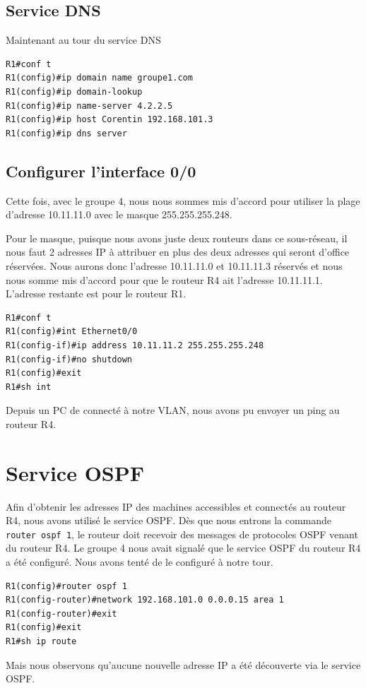 \documentclass[a4paper,10pt]{article}
\begin{document}
\subsection{Service DNS}
Maintenant au tour du service DNS
\begin{verbatim}
R1#conf t
R1(config)#ip domain name groupe1.com
R1(config)#ip domain-lookup
R1(config)#ip name-server 4.2.2.5
R1(config)#ip host Corentin 192.168.101.3
R1(config)#ip dns server
\end{verbatim}

\subsection{Configurer l'interface 0/0}
Cette fois, avec le groupe 4, nous nous sommes mis d'accord pour utiliser la plage d'adresse 10.11.11.0 avec le masque 255.255.255.248.

Pour le masque, puisque nous avons juste deux routeurs dans ce sous-réseau, il nous faut 2 adresses IP à attribuer en plus des deux adresses qui seront d'office réservées.
Nous aurons donc l'adresse 10.11.11.0 et 10.11.11.3 réservés et nous nous somme mis d'accord pour que le routeur R4 ait l'adresse 10.11.11.1.
L'adresse restante est pour le routeur R1.
\begin{verbatim}
R1#conf t
R1(config)#int Ethernet0/0
R1(config-if)#ip address 10.11.11.2 255.255.255.248
R1(config-if)#no shutdown
R1(config)#exit
R1#sh int
\end{verbatim}
Depuis un PC de connecté à notre VLAN, nous avons pu envoyer un ping au routeur R4.

\section{Service OSPF}
Afin d'obtenir les adresses IP des machines accessibles et connectés au routeur R4, nous avons utilisé le service OSPF.
Dès que nous entrons la commande \texttt{router ospf 1}, le routeur doit recevoir des messages de protocoles OSPF venant du routeur R4.
Le groupe 4 nous avait signalé que le service OSPF du routeur R4 a été configuré. Nous avons tenté de le configuré à notre tour.
\begin{verbatim}
R1(config)#router ospf 1
R1(config-router)#network 192.168.101.0 0.0.0.15 area 1
R1(config-router)#exit
R1(config)#exit
R1#sh ip route
\end{verbatim}
Mais nous observons qu'aucune nouvelle adresse IP a été découverte via le service OSPF.
\end{document}
